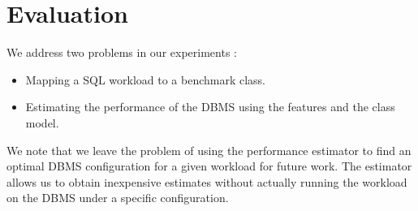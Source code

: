 \section{Evaluation} \label{sec:eval}

We address two problems in our experiments :
\begin{itemize}
	\item Mapping a SQL workload to a benchmark class.
	\item Estimating the performance of the DBMS using the features and the class
	model.
\end{itemize}

We note that we leave the problem of using the performance estimator to find
an optimal DBMS configuration for a given workload for future work. The
estimator allows us to obtain inexpensive estimates without actually running
the workload on the DBMS under a specific configuration.


